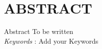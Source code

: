 \clearpage
{}
{}
\chapter*{ABSTRACT}
Abstract To be written
\\
\textit{Keywords} : Add your Keywords